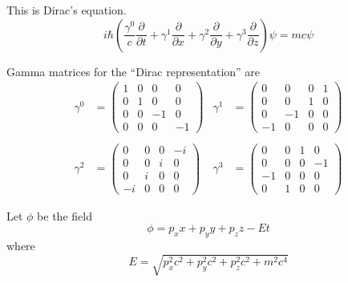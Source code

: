 \documentclass[12pt]{article}
\begin{document}
\noindent
This is Dirac's equation.
\begin{equation*}
i\hbar\left(
\frac{\gamma^0}{c}\frac{\partial}{\partial t}+
\gamma^1\frac{\partial}{\partial x}+
\gamma^2\frac{\partial}{\partial y}+
\gamma^3\frac{\partial}{\partial z}
\right)\psi
=mc\psi
\end{equation*}

\noindent
Gamma matrices for the ``Dirac representation'' are
\begin{align*}
\gamma^0&=\begin{pmatrix}1&0&0&0\\0&1&0&0\\0&0&-1&0\\0&0&0&-1\end{pmatrix}
& \gamma^1&=\begin{pmatrix}0&0&0&1\\0&0&1&0\\0&-1&0&0\\-1&0&0&0\end{pmatrix}
\\
\\
\gamma^2&=\begin{pmatrix}0&0&0&-i\\0&0&i&0\\0&i&0&0\\-i&0&0&0\end{pmatrix}
& \gamma^3&=\begin{pmatrix}0&0&1&0\\0&0&0&-1\\-1&0&0&0\\0&1&0&0\end{pmatrix}
\end{align*}

\noindent
Let $\phi$ be the field
\begin{equation*}
\phi=p_xx+p_yy+p_zz-Et
\end{equation*}
where
\begin{equation*}
E=\sqrt{p_x^2c^2+p_y^2c^2+p_z^2c^2+m^2c^4}
\end{equation*}
\end{document}
